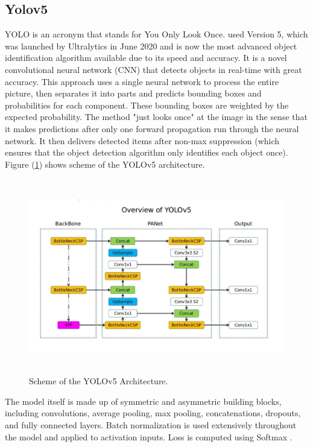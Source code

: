 \subsection{Yolov5}
YOLO is an acronym that stands for You Only Look Once. 
used Version 5, which was launched by Ultralytics in June 2020 and is now the 
most advanced object identification algorithm available due to its speed and accuracy. 
It is a novel convolutional neural network (CNN) that detects objects in real-time with 
great accuracy. This approach uses a single neural network to process the entire picture, 
then separates it into parts and predicts bounding boxes and probabilities for each 
component. These bounding boxes are weighted by the expected probability. The method 
"just looks once" at the image in the sense that it makes predictions after only one 
forward propagation run through the neural network. It then delivers detected items 
after non-max suppression (which ensures that the object detection algorithm only identifies each object once). 
Figure (\ref{fig:yolov5}) shows scheme of the YOLOv5 architecture.
\begin{figure}[H]
    \centering
    \includegraphics[height=85mm]{photos/chapter03/4.jpg}
    \caption{Scheme of the YOLOv5 Architecture.}
    \label{fig:yolov5}
\end{figure}
The model itself is made up of symmetric and asymmetric building blocks, 
including convolutions, average pooling, max pooling, concatenations, 
dropouts, and fully connected layers. Batch normalization is used extensively 
throughout the model and applied to activation inputs. Loss is computed using Softmax \cite{dem19}.
